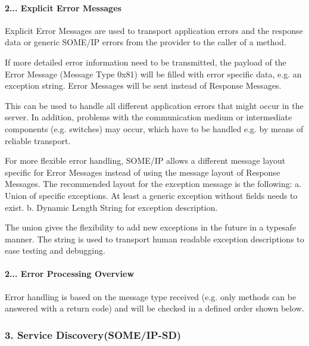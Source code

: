 \paragraph*{2... Explicit Error Messages}


\begin{DoxyItemize}
\item Explicit Error Messages are used to transport application errors and the response data or generic S\+O\+M\+E/\+IP errors from the provider to the caller of a method.
\item If more detailed error information need to be transmitted, the payload of the Error Message (Message Type 0x81) will be filled with error specific data, e.\+g. an exception string. Error Messages will be sent instead of Response Messages.
\item This can be used to handle all different application errors that might occur in the server. In addition, problems with the communication medium or intermediate components (e.\+g. switches) may occur, which have to be handled e.\+g. by means of reliable transport.
\item For more flexible error handling, S\+O\+M\+E/\+IP allows a different message layout specific for Error Messages instead of using the message layout of Response Messages. The recommended layout for the exception message is the following\+: a. Union of specific exceptions. At least a generic exception without fields needs to exist. b. Dynamic Length String for exception description.
\item The union gives the flexibility to add new exceptions in the future in a typesafe manner. The string is used to transport human readable exception descriptions to ease testing and debugging.
\end{DoxyItemize}

\paragraph*{2... Error Processing Overview}

Error handling is based on the message type received (e.\+g. only methods can be answered with a return code) and will be checked in a defined order shown below.

 \hypertarget{adaptive_communicationmanagement_someip_service_discovery}{}\subsubsection{3. Service Discovery(\+S\+O\+M\+E/\+I\+P-\/\+S\+D)}\label{adaptive_communicationmanagement_someip_service_discovery}

